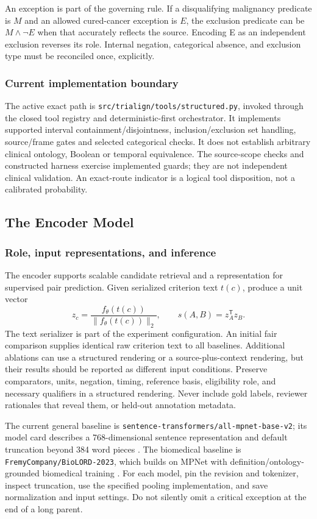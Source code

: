\documentclass[10pt,letterpaper]{article}
\newcommand{\pathcode}[1]{\nolinkurl{#1}}
\begin{document}
An exception is part of the governing rule. If a disqualifying malignancy
predicate is $M$ and an allowed cured-cancer exception is $E$, the exclusion
predicate can be $M\land\neg E$ when that accurately reflects the source.
Encoding E as an independent exclusion reverses its role. Internal negation,
categorical absence, and exclusion type must be reconciled once, explicitly.

\subsubsection{Current implementation boundary}
The active exact path is \pathcode{src/trialign/tools/structured.py}, invoked
through the closed tool registry and deterministic-first orchestrator. It
implements supported interval containment/disjointness, inclusion/exclusion
set handling, source/frame gates and selected categorical checks. It does
not establish arbitrary clinical ontology, Boolean or temporal equivalence.
The source-scope checks and constructed harness exercise implemented guards;
they are not independent clinical validation. An exact-route indicator is a
logical tool disposition, not a calibrated probability.

\subsection{The Encoder Model}
\label{sec:encoder}

\subsubsection{Role, input representations, and inference}
The encoder supports scalable candidate retrieval and a representation for
supervised pair prediction. Given serialized criterion text $t(c)$, produce
a unit vector
\[
 z_c=\frac{f_{\theta}(t(c))}{\|f_{\theta}(t(c))\|_2},\qquad
 s(A,B)=z_A^{\mathsf T}z_B.
\]
The text serializer is part of the experiment configuration. An initial fair
comparison supplies identical raw criterion text to all baselines. Additional
ablations can use a structured rendering or a source-plus-context rendering,
but their results should be reported as different input conditions. Preserve
comparators, units, negation, timing, reference basis, eligibility role, and
necessary qualifiers in a structured rendering. Never include gold labels,
reviewer rationales that reveal them, or held-out annotation metadata.

The current general baseline is
\pathcode{sentence-transformers/all-mpnet-base-v2}; its model card describes
a 768-dimensional sentence representation and default truncation beyond 384
word pieces \cite{mpnet}. The biomedical baseline is
\pathcode{FremyCompany/BioLORD-2023}, which builds on MPNet with
definition/ontology-grounded biomedical training \cite{biolord}.
For each model, pin the revision and tokenizer, inspect truncation, use the
specified pooling implementation, and save normalization and input settings.
Do not silently omit a critical exception at the end of a long parent.
\end{document}
